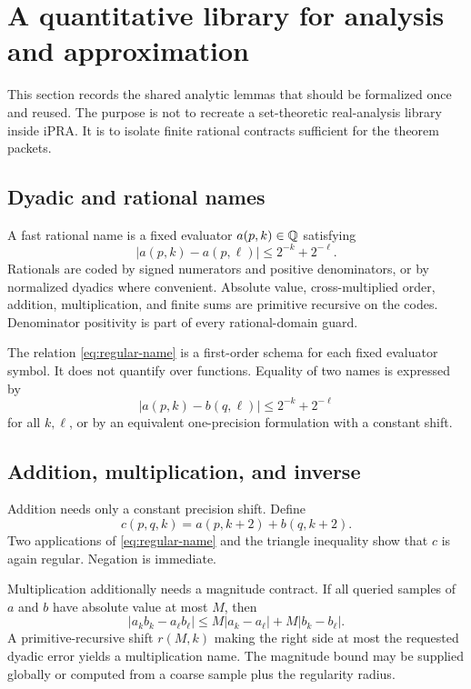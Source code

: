 \section{A quantitative library for analysis and approximation}
\label{sec:analysis-library}

This section records the shared analytic lemmas that should be formalized once
and reused.  The purpose is not to recreate a set-theoretic real-analysis
library inside iPRA.  It is to isolate finite rational contracts sufficient for
the theorem packets.

\subsection{Dyadic and rational names}

A fast rational name is a fixed evaluator \(a(p,k)\in\mathbb Q\) satisfying
\begin{equation}
 |a(p,k)-a(p,\ell)|\le 2^{-k}+2^{-\ell}.
 \label{eq:regular-name}
\end{equation}
Rationals are coded by signed numerators and positive denominators, or by
normalized dyadics where convenient.  Absolute value, cross-multiplied order,
addition, multiplication, and finite sums are primitive recursive on the
codes.  Denominator positivity is part of every rational-domain guard.

The relation \eqref{eq:regular-name} is a first-order schema for each fixed
evaluator symbol.  It does not quantify over functions.  Equality of two
names is expressed by
\[
 |a(p,k)-b(q,\ell)|\le 2^{-k}+2^{-\ell}
\]
for all \(k,\ell\), or by an equivalent one-precision formulation with a
constant shift.

\subsection{Addition, multiplication, and inverse}

Addition needs only a constant precision shift.  Define
\[
 c(p,q,k)=a(p,k+2)+b(q,k+2).
\]
Two applications of \eqref{eq:regular-name} and the triangle inequality show
that \(c\) is again regular.  Negation is immediate.

Multiplication additionally needs a magnitude contract.  If all queried
samples of \(a\) and \(b\) have absolute value at most \(M\), then
\[
 |a_kb_k-a_\ell b_\ell|
 \le M|a_k-a_\ell|+M|b_k-b_\ell|.
\]
A primitive-recursive shift \(r(M,k)\) making the right side at most the
requested dyadic error yields a multiplication name.  The magnitude bound may
be supplied globally or computed from a coarse sample plus the regularity
radius.

